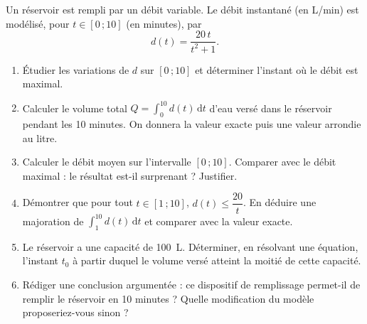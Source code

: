 \documentclass[11pt]{article}
\begin{document}
\begin{exercice}
Un réservoir est rempli par un débit variable. Le débit instantané (en \si{L/min}) est modélisé, pour $t\in[0\,;10]$ (en minutes), par
\[d(t)=\dfrac{20\,t}{t^2+1}.\]
\begin{enumerate}
\item Étudier les variations de $d$ sur $[0\,;10]$ et déterminer l'instant où le débit est maximal.
\item Calculer le volume total $Q=\displaystyle\int_{0}^{10}d(t)\,\mathrm{d}t$ d'eau versé dans le réservoir pendant les 10 minutes. On donnera la valeur exacte puis une valeur arrondie au litre.
\item Calculer le débit moyen sur l'intervalle $[0\,;10]$. Comparer avec le débit maximal : le résultat est-il surprenant ? Justifier.
\item Démontrer que pour tout $t\in[1\,;10]$, $d(t)\leq \dfrac{20}{t}$. En déduire une majoration de $\displaystyle\int_{1}^{10}d(t)\,\mathrm{d}t$ et comparer avec la valeur exacte.
\item Le réservoir a une capacité de \SI{100}{L}. Déterminer, en résolvant une équation, l'instant $t_0$ à partir duquel le volume versé atteint la moitié de cette capacité.
\item Rédiger une conclusion argumentée : ce dispositif de remplissage permet-il de remplir le réservoir en 10 minutes ? Quelle modification du modèle proposeriez-vous sinon ?
\end{enumerate}
\end{exercice}
\end{document}
